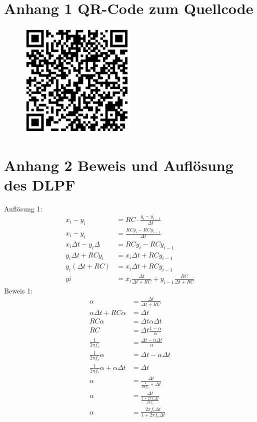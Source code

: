 \documentclass[12pt,a4paper, ngerman]{article}
\begin{document}
\section{Anhang 1 QR-Code zum Quellcode}
\begin{figure}[h!]
\centering
\includegraphics[width=0.5\textwidth]{qrcode.png}
\end{figure}
\newpage
\section{Anhang 2 Beweis und Auflösung des DLPF}
Auflösung 1:
\begin{align*} 
x_{i}-y_{i}&=RC\cdot \frac{y_{i}-y_{i-1}}{\Delta t} \\ 
x_{i}-y_{i}&=\frac{RCy_{i}-RCy_{i-1}}{\Delta t}\\
x_{i}\Delta t-y_{i}\Delta&=RCy_{i}-RCy_{i-1} \\
y_{i}\Delta t+RCy_{i}&=x_{i}\Delta t+RCy_{i-1} \\
y_{i}(\Delta t+RC)&=x_{i}\Delta t+RCy_{i-1} \\
y{i}&=x_{i}\frac{\Delta t}{\Delta t+RC} + y_{i-1}\frac{RC}{\Delta t+RC}
\end{align*}
Beweis 1:
\begin{align*}
\alpha&=\frac{\Delta t}{\Delta t+RC} \\
\alpha \Delta t+RC\alpha &= \Delta t \\
RC\alpha &= \Delta t \alpha \Delta t \\
RC &= \Delta t \frac{1-\alpha}{\alpha}\\
\frac{1}{2\pi f_{c}} &= \frac{\Delta t -\alpha\Delta t}{\alpha} \\
\frac{1}{2\pi f_{c}} \alpha &= \Delta t -\alpha\Delta t \\
\frac{1}{2\pi f_{c}} \alpha + \alpha\Delta t &= \Delta t \\
\alpha &= \frac{\Delta t}{\frac{1}{2\pi f_{c}} + \Delta t} \\
\alpha &= \frac{\Delta t}{\frac{1+2\pi f_{c}\Delta t}{2\pi f_{c}}} \\
\alpha &= \frac{2\pi f_{c}\Delta t}{1+2\pi f_{c}\Delta t} 
\end{align*}
\end{document}
